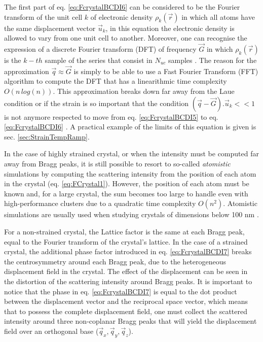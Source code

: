 The first part of eq. \ref{eq:FcrystalBCDI6} can be considered to be the Fourier transform of the unit cell $k$ of electronic density $\rho_k(\vec{r})$ in which all atoms have the same displacement vector $\vec{u}_k$, in this equation the electronic density is allowed to vary from one unit cell to another.
Moreover, one can recognise the expression of a discrete Fourier transform (DFT) of frequency $\vec{G}$ in which $\rho_k(\vec{r})$ is the $k-th$ sample of the series that consist in $N_{uc}$ samples \parencite{Cooley1965, Cochran1967, favre-nicolin_semiconductor_2011, Godard2021}.
The reason for the approximation $\vec{q} \approx \vec{G}$ is simply to be able to use a Fast Fourier Transform (FFT) algorithm to compute the DFT that has a linearithmic time complexity $O(n \, log(n))$.
This approximation breaks down far away from the Laue condition or if the strain is so important that the condition $(\vec{q}-\vec{G}).\vec{u}_k<<1$ is not anymore respected to move from eq. \ref{eq:FcrystalBCDI5} to eq. \ref{eq:FcrystalBCDI6} \parencite{Takagi1969}.
A practical example of the limits of this equation is given is sec. \ref{sec:StrainTempRamp}.

In the case of highly strained crystal, or when the intensity must be computed far away from Bragg peaks, it is still possible to resort to so-called \textit{atomistic} simulations by computing the scattering intensity from the position of each atom in the crystal (eq. \ref{eq:FCrystal1}).
However, the position of each atom must be known and, for a large crystal, the sum becomes too large to handle even with high-performance clusters due to a quadratic time complexity $O(n^2)$.
Atomistic simulations are usually used when studying crystals of dimensions below 100 nm \parencite{Dupraz2022}.

For a non-strained crystal, the Lattice factor is the same at each Bragg peak, equal to the Fourier transform of the crystal's lattice.
In the case of a strained crystal, the additional phase factor introduced in eq. \ref{eq:FcrystalBCDI7} breaks the centrosymmetry around each Bragg peak, due to the heterogeneous displacement field in the crystal.
The effect of the displacement can be seen in the distortion of the scattering intensity around Bragg peaks.
It is important to notice that the phase in eq. \ref{eq:FcrystalBCDI7} is equal to the dot product between the displacement vector and the reciprocal space vector, which means that to possess the complete displacement field, one must collect the scattered intensity around three non-coplanar Bragg peaks \parencite{Newton2010} that will yield the displacement field over an orthogonal base ($\vec{q}_x, \vec{q}_y, \vec{q}_z$).

